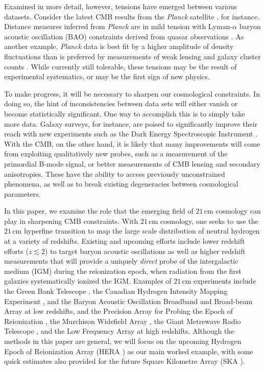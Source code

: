 \documentclass[twocolumn,aps,prd,nofootinbib,showpacs,superscriptaddress]{revtex4-1}
\begin{document}
Examined in more detail, however, tensions have emerged between various datasets. Consider the latest CMB results from the \emph{Planck} satellite \cite{Planck2015overview}, for instance. Distance measures inferred from \emph{Planck} are in mild tension with Lyman-$\alpha$ baryon acoustic oscillation (BAO) constraints derived from quasar observations \cite{Planck2015parameters}. As another example, \emph{Planck} data is best fit by a higher amplitude of density fluctuations than is preferred by measurements of weak lensing and galaxy cluster counts \cite{Planck2015clusters}. While currently still tolerable, these tensions may be the result of experimental systematics, or may be the first sign of new physics. 

To make progress, it will be necessary to sharpen our cosmological constraints. In doing so, the hint of inconsistencies between data sets will either vanish or become statistically significant. One way to accomplish this is to simply take more data. Galaxy surveys, for instance, are poised to significantly improve their reach with new experiments such as the Dark Energy Spectroscopic Instrument \cite{levi_et_al2013}. With the CMB, on the other hand, it is likely that many improvements will come from exploiting qualitatively new probes, such as a measurement of the primordial B-mode signal, or better measurements of CMB lensing and secondary anisotropies. These have the ability to access previously unconstrained phenomena, as well as to break existing degeneracies between cosmological parameters.

In this paper, we examine the role that the emerging field of $21\,\textrm{cm}$ cosmology can play in sharpening CMB constraints. With $21\,\textrm{cm}$ cosmology, one seeks to use the $21\,\textrm{cm}$ hyperfine transition to map the large scale distribution of neutral hydrogen at a variety of redshifts. Existing and upcoming efforts include lower redshift efforts ($z \lesssim 2$) to target baryon acoustic oscillations as well as higher redshift measurements that will provide a uniquely \emph{direct} probe of the intergalactic medium (IGM) during the reionization epoch, when radiation from the first galaxies systematically ionized the IGM. Examples of $21\,\textrm{cm}$ experiments include the Green Bank Telescope \cite{masui_et_al2013,switzer_et_al2013}, the Canadian Hydrogen Intensity Mapping Experiment \cite{shaw_et_al2014a}, and the Baryon Acoustic Oscillation Broadband and Broad-beam Array \cite{pober_et_al2013} at low redshifts, and the Precision Array for Probing the Epoch of Reionization \cite{parsons_et_al2010}, the Murchison Widefield Array \cite{tingay_et_al2013,bowman_et_al2012}, the Giant Metrewave Radio Telescope \cite{paciga_et_al2013}, and the Low Frequency Array \cite{van_haarlem_et_al2013} at high redshifts. Although the methods in this paper are general, we will focus on the upcoming Hydrogen Epoch of Reionization Array (HERA \cite{pober_et_al2014}) as our main worked example, with some quick estimates also provided for the future Square Kilometre Array (SKA \cite{mellema_et_al2013}).
\end{document}
